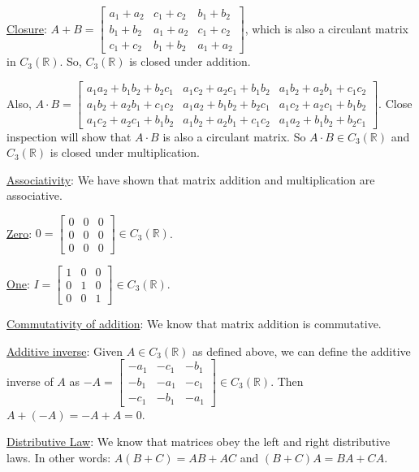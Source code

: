 \underline{Closure}: 
$A+B=
\begin{bmatrix}
a_1+a_2 & c_1+c_2 & b_1+b_2\\
b_1+b_2 & a_1+a_2 & c_1+c_2\\
c_1+c_2 & b_1+b_2 & a_1+a_2
\end{bmatrix}$,
which is also a circulant matrix in $C_3({\mathbb R})$.  So, $C_3({\mathbb R})$ is closed under addition.

Also, $A\cdot B=
\begin{bmatrix}
a_1a_2+b_1b_2+b_2c_1 & a_1c_2+a_2c_1+b_1b_2 & a_1b_2+a_2b_1+c_1c_2\\
a_1b_2+a_2b_1+c_1c_2 & a_1a_2+b_1b_2+b_2c_1 & a_1c_2+a_2c_1+b_1b_2\\
a_1c_2+a_2c_1+b_1b_2 & a_1b_2+a_2b_1+c_1c_2 & a_1a_2+b_1b_2+b_2c_1
\end{bmatrix}$.  Close inspection will show that $A\cdot B$ is also a circulant matrix.  So $A\cdot B\in C_3({\mathbb R})$ and $C_3({\mathbb R})$ is closed under multiplication.

\underline{Associativity}:  We have shown that matrix addition and multiplication are associative.

\underline{Zero}:  $0=
\begin{bmatrix}
0 & 0 & 0\\
0 & 0 & 0\\
0 & 0 & 0
\end{bmatrix}\in C_3({\mathbb R})$.

\underline{One}:  $I=
\begin{bmatrix}
1 & 0 & 0\\
0 & 1 & 0\\
0 & 0 & 1
\end{bmatrix}\in C_3({\mathbb R})$.

\underline{Commutativity of addition}:  We know that matrix addition is commutative.

\underline{Additive inverse}:  Given $A\in C_3({\mathbb R})$ as defined above, we can define the additive inverse of $A$ as $-A=
\begin{bmatrix}
-a_1 & -c_1 & -b_1\\
-b_1 & -a_1 & -c_1\\
-c_1 & -b_1 & -a_1
\end{bmatrix} \in C_3({\mathbb R})$.  Then $A+(-A)=-A+A=0$.

\underline{Distributive Law}:  We know that matrices obey the left and right distributive laws.  In other words:  $A(B+C)=AB+AC$ and $(B+C)A=BA+CA$.


